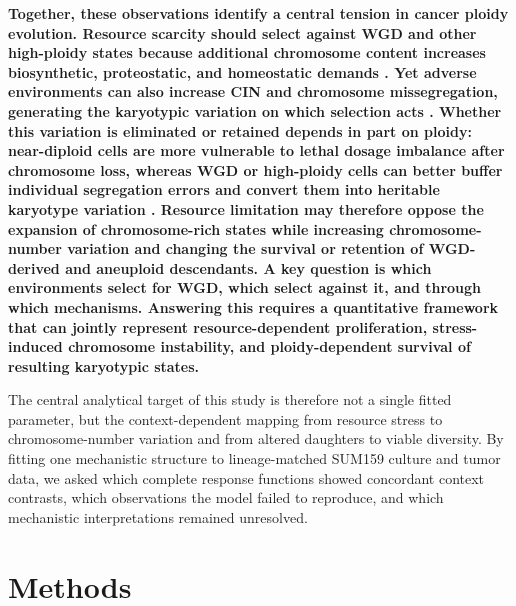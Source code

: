 \documentclass[11pt]{article}
\begin{document}
\textbf{Together, these observations identify a central tension in cancer ploidy evolution. Resource scarcity should select against WGD and other high-ploidy states because additional chromosome content increases biosynthetic, proteostatic, and homeostatic demands \cite{donovan_hyperdiploid_2014,nowicka_interactions_2025,beck_energetics_2025}. Yet adverse environments can also increase CIN and chromosome missegregation, generating the karyotypic variation on which selection acts \cite{nowicka_interactions_2025,beck_energetics_2025}. Whether this variation is eliminated or retained depends in part on ploidy: near-diploid cells are more vulnerable to lethal dosage imbalance after chromosome loss, whereas WGD or high-ploidy cells can better buffer individual segregation errors and convert them into heritable karyotype variation \cite{lopez_interplay_2020,elizalde_markov_2018,santaguida_chromosome_2017,beck_alfa-k_2025}. Resource limitation may therefore oppose the expansion of chromosome-rich states while increasing chromosome-number variation and changing the survival or retention of WGD-derived and aneuploid descendants. A key question is which environments select for WGD, which select against it, and through which mechanisms. Answering this requires a quantitative framework that can jointly represent resource-dependent proliferation, stress-induced chromosome instability, and ploidy-dependent survival of resulting karyotypic states.}

The central analytical target of this study is therefore not a single fitted parameter, but the context-dependent mapping from resource stress to chromosome-number variation and from altered daughters to viable diversity. By fitting one mechanistic structure to lineage-matched SUM159 culture and tumor data, we asked which complete response functions showed concordant context contrasts, which observations the model failed to reproduce, and which mechanistic interpretations remained unresolved.

\section*{Methods}
\end{document}

